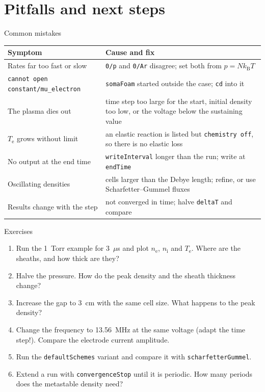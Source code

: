 \documentclass[aspectratio=169,11pt]{beamer}
\newcommand{\kw}[1]{\texttt{#1}}
\newcommand{\Te}{T_\mathrm{e}}
\newcommand{\nel}{n_\mathrm{e}}
\begin{document}
\section{Pitfalls and next steps}

\begin{frame}{Common mistakes}
  \small
  \begin{tabular}{p{}p{}}
    \toprule
    Symptom & Cause and fix \\
    \midrule
    Rates far too fast or slow & \kw{0/p} and \kw{0/Ar} disagree; set both from $p=Nk_\mathrm{B}T$ \\
    \kw{cannot open constant/mu\_electron} & \kw{somaFoam} started outside the case; \kw{cd} into it \\
    The plasma dies out & time step too large for the start, initial density too low,
          or the voltage below the sustaining value \\
    $\Te$ grows without limit & an elastic reaction is listed but \kw{chemistry off}, so
          there is no elastic loss \\
    No output at the end time & \kw{writeInterval} longer than the run; write at \kw{endTime} \\
    Oscillating densities & cells larger than the Debye length; refine, or use
          Scharfetter--Gummel fluxes \\
    Results change with the step & not converged in time; halve \kw{deltaT} and compare \\
    \bottomrule
  \end{tabular}
\end{frame}

\begin{frame}{Exercises}
  \begin{enumerate}
    \item Run the 1~Torr example for 3~$\mu$s and plot $\nel$, $n_\mathrm{i}$ and $\Te$.
          Where are the sheaths, and how thick are they?
    \item Halve the pressure. How do the peak density and the sheath thickness change?
    \item Increase the gap to 3~cm with the same cell size. What happens to the peak density?
    \item Change the frequency to 13.56~MHz at the same voltage (adapt the time step!).
          Compare the electrode current amplitude.
    \item Run the \kw{defaultSchemes} variant and compare it with \kw{scharfetterGummel}.
    \item Extend a run with \kw{convergenceStop} until it is periodic. How many periods does
          the metastable density need?
  \end{enumerate}
\end{frame}
\end{document}

